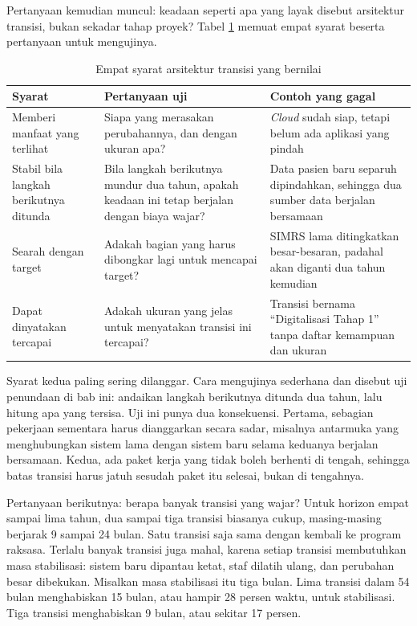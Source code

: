 Pertanyaan kemudian muncul: keadaan seperti apa yang layak disebut arsitektur
transisi, bukan sekadar tahap proyek? Tabel \ref{tab:ch12-syarat} memuat empat
syarat beserta pertanyaan untuk mengujinya.

\begin{table}[!htb]
  \centering
  \caption{Empat syarat arsitektur transisi yang bernilai}
  \label{tab:ch12-syarat}
  \begin{tabularx}{\textwidth}{>{\raggedright\arraybackslash}p{2.4cm}
                               >{\raggedright\arraybackslash}X
                               >{\raggedright\arraybackslash}X}
    \hline
    \textbf{Syarat} & \textbf{Pertanyaan uji} & \textbf{Contoh yang gagal} \\
    \hline
    Memberi manfaat yang terlihat & Siapa yang merasakan perubahannya, dan
      dengan ukuran apa? & \textit{Cloud} sudah siap, tetapi belum ada
      aplikasi yang pindah \\
    \hline
    Stabil bila langkah berikutnya ditunda & Bila langkah berikutnya mundur
      dua tahun, apakah keadaan ini tetap berjalan dengan biaya wajar? & Data
      pasien baru separuh dipindahkan, sehingga dua sumber data berjalan
      bersamaan \\
    \hline
    Searah dengan target & Adakah bagian yang harus dibongkar lagi untuk
      mencapai target? & SIMRS lama ditingkatkan besar-besaran, padahal akan
      diganti dua tahun kemudian \\
    \hline
    Dapat dinyatakan tercapai & Adakah ukuran yang jelas untuk menyatakan
      transisi ini tercapai? & Transisi bernama ``Digitalisasi Tahap 1''
      tanpa daftar kemampuan dan ukuran \\
    \hline
  \end{tabularx}
\end{table}

Syarat kedua paling sering dilanggar. Cara mengujinya sederhana dan disebut uji
penundaan di bab ini: andaikan langkah berikutnya ditunda dua tahun, lalu
hitung apa yang tersisa. Uji ini punya dua konsekuensi. Pertama, sebagian
pekerjaan sementara harus dianggarkan secara sadar, misalnya antarmuka yang
menghubungkan sistem lama dengan sistem baru selama keduanya berjalan
bersamaan. Kedua, ada paket kerja yang tidak boleh berhenti di tengah, sehingga
batas transisi harus jatuh sesudah paket itu selesai, bukan di tengahnya.

Pertanyaan berikutnya: berapa banyak transisi yang wajar? Untuk horizon empat
sampai lima tahun, dua sampai tiga transisi biasanya cukup, masing-masing
berjarak 9 sampai 24 bulan. Satu transisi saja sama dengan kembali ke program
raksasa. Terlalu banyak transisi juga mahal, karena setiap transisi membutuhkan
masa stabilisasi: sistem baru dipantau ketat, staf dilatih ulang, dan perubahan
besar dibekukan. Misalkan masa stabilisasi itu tiga bulan. Lima transisi dalam
54 bulan menghabiskan 15 bulan, atau hampir 28 persen waktu, untuk
stabilisasi. Tiga transisi menghabiskan 9 bulan, atau sekitar 17 persen.


